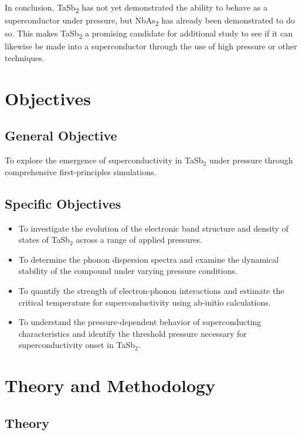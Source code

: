 \documentclass[12pt,a4paper]{article}
\begin{document}
In conclusion, TaSb\textsubscript{2} has not yet demonstrated the ability to behave as a superconductor under pressure, but NbAs\textsubscript{2} has already been demonstrated to do so. This makes TaSb\textsubscript{2} a promising candidate for additional study to see if it can likewise be made into a superconductor through the use of high pressure or other techniques.
\newpage
\section{Objectives}
\subsection{General Objective}
\begin{itemize}
     To explore the emergence of superconductivity in TaSb$_2$ under pressure through comprehensive first-principles simulations.
\end{itemize}

\subsection{Specific Objectives}
\begin{itemize}
    \item To investigate the evolution of the electronic band structure and density of states of TaSb$_2$ across a range of applied pressures.
    \item To determine the phonon dispersion spectra and examine the dynamical stability of the compound under varying pressure conditions.
    \item To quantify the strength of electron-phonon interactions and estimate the critical temperature for superconductivity using ab-initio calculations.
    \item To understand the pressure-dependent behavior of superconducting characteristics and identify the threshold pressure necessary for superconductivity onset in TaSb$_2$.
\end{itemize}


\pagebreak




\section{Theory and Methodology}
\subsection{Theory}
\end{document}
